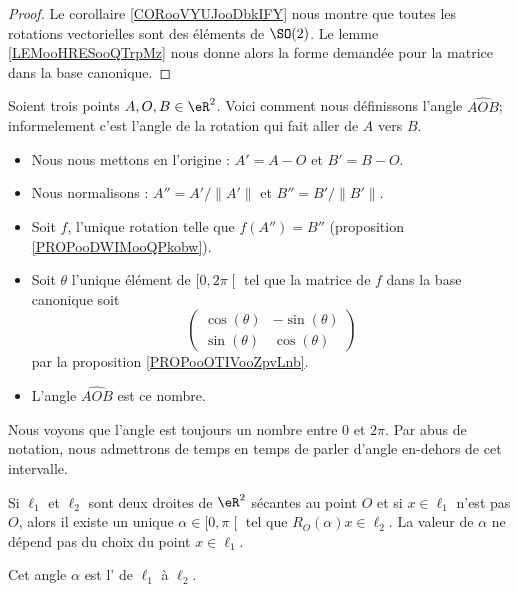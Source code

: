 \begin{proof}
    Le corollaire \ref{CORooVYUJooDbkIFY} nous montre que toutes les rotations vectorielles sont des éléments de \( \SO(2)\). Le lemme \ref{LEMooHRESooQTrpMz} nous donne alors la forme demandée pour la matrice dans la base canonique.
\end{proof}

\begin{definition}      \label{DEFooUPUUooKAPFrh}
    Soient trois points \( A,O,B\in \eR^2\). Voici comment nous définissons l'angle \( \widehat{AOB}\); informelement c'est l'angle de la rotation qui fait aller de \( A\) vers \( B\).
    \begin{itemize}
        \item Nous nous mettons en l'origine : \( A'=A-O\) et \( B'=B-O\).
        \item Nous normalisons : \( A''=A'/\| A' \|\) et \( B''=B'/\| B' \|\).
        \item Soit \( f\), l'unique rotation telle que \( f(A'')=B''\) (proposition \ref{PROPooDWIMooQPkobw}).
        \item Soit \( \theta\) l'unique élément de \( \mathopen[ 0 , 2\pi \mathclose[\) tel que la matrice de \( f\) dans la base canonique soit
    \begin{equation}
        \begin{pmatrix}
            \cos(\theta)    &   -\sin(\theta)    \\
            \sin(\theta)    &   \cos(\theta)
        \end{pmatrix}
    \end{equation}
    par la proposition \ref{PROPooOTIVooZpvLnb}.
\item L'angle \( \widehat{AOB}\) est ce nombre.
    \end{itemize}
\end{definition}

Nous voyons que l'angle est toujours un nombre entre \( 0\) et \( 2\pi\). Par abus de notation, nous admettrons de temps en temps de parler d'angle en-dehors de cet intervalle.

\begin{lemmaDef}        \label{DEFooEGKOooRPGOAs}
    Si \( \ell_1\) et \( \ell_2\) sont deux droites de \( \eR^2\) sécantes au point \( O\) et si \( x\in\ell_1\) n'est pas \( O\), alors il existe un unique \( \alpha\in \mathopen[ 0 , \pi \mathclose[\) tel que \( R_O(\alpha)x\in \ell_2\). La valeur de \( \alpha\) ne dépend pas du choix du point \( x\in \ell_1\).

        Cet angle \( \alpha\) est l' de \( \ell_1\) à \( \ell_2\).
\end{lemmaDef}


